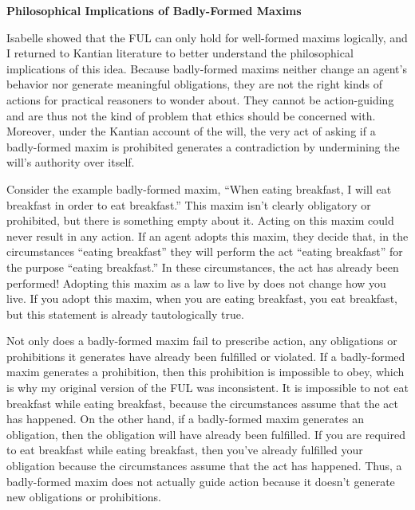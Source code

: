 \begin{isabellebody}
\begin{isamarkuptext}
\noindent \textbf{Philosophical Implications of Badly-Formed Maxims}

Isabelle showed that the FUL can only hold for well-formed maxims logically, and I returned to Kantian
literature to better understand the philosophical implications of this idea. Because badly-formed maxims
neither change an agent's behavior nor generate meaningful obligations, they are not the right kinds of 
actions for practical reasoners to wonder about. They cannot be action-guiding and are thus not the kind of problem that 
ethics should be concerned with. Moreover, under the Kantian account of the will, the very act of asking 
if a badly-formed maxim is prohibited generates a contradiction by undermining the will's authority over itself. 

Consider the example badly-formed maxim, ``When eating breakfast, I will eat breakfast in order to 
eat breakfast.'' This maxim isn't clearly obligatory or prohibited, but there is something empty about 
it. Acting on this maxim could never result in any action. If an agent adopts this maxim, 
they decide that, in the circumstances ``eating breakfast'' they will perform the act ``eating breakfast''
for the purpose ``eating breakfast.'' In these circumstances, the act has 
already been performed! Adopting this maxim as a law to live by does not change how you live. If you adopt 
this maxim, when you are eating breakfast, you eat breakfast, but this statement is already tautologically true. 

Not only does a badly-formed maxim fail to prescribe action, any obligations or prohibitions it 
generates have already been fulfilled or violated. If a badly-formed maxim generates a prohibition, 
then this prohibition is impossible to obey, which is why my original version of the FUL was inconsistent. 
It is impossible to not eat breakfast while eating breakfast, because the circumstances assume that the 
act has happened. On the other hand, if a badly-formed maxim generates an obligation, then the obligation 
will have already been fulfilled. If you are required to eat breakfast while eating breakfast, then you've 
already fulfilled your obligation because the circumstances assume that the act has happened. Thus, 
a badly-formed maxim does not actually guide action because it doesn't generate new obligations or 
prohibitions. 


\end{isamarkuptext}
\end{isabellebody}
